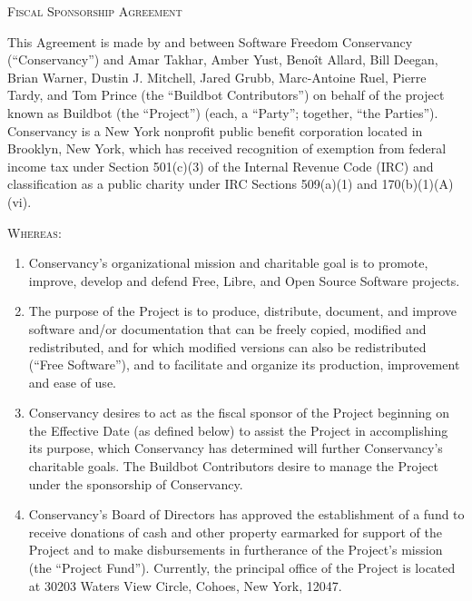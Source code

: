\documentclass[letterpaper,12pt]{article}
\begin{document}
\begin{center}
\textsc{\Huge Fiscal Sponsorship Agreement}{\Huge {} } 
\par\end{center}

\bigskip{}


This Agreement is made by and between Software Freedom Conservancy
(``Conservancy'') and 
Amar Takhar,
Amber Yust,
Benoît Allard,
Bill Deegan,
Brian Warner,
Dustin J. Mitchell,
Jared Grubb,
Marc-Antoine Ruel,
Pierre Tardy, and
Tom Prince
 (the ``Buildbot Contributors'')
on behalf of the project known as Buildbot (the ``Project'') (each, a
``Party''; together, ``the Parties'').  Conservancy is a New York nonprofit
public benefit corporation located in Brooklyn, New York, which has received 
recognition of exemption from federal income tax under Section 501(c)(3) of
the Internal Revenue Code (IRC) and classification as a public charity under 
IRC Sections 509(a)(1) and 170(b)(1)(A)(vi).

\textsc{Whereas:}

\begin{enumerate}[label=\Alph*.,ref=\S \Alph*]
\item Conservancy's organizational mission and charitable goal is to promote,
improve, develop and defend Free, Libre, and Open Source Software
projects. 
\item The purpose of the Project is to produce, distribute, document, and
improve software and/or documentation that can be freely copied, modified and redistributed,
and for which modified versions can also be redistributed (``Free Software''),
and to facilitate and organize its production, improvement and ease
of use. 
\item Conservancy desires to act as the fiscal sponsor of the Project beginning
on the Effective Date (as defined below) to assist the Project in
accomplishing its purpose, which Conservancy has determined will further
Conservancy's charitable goals. The Buildbot Contributors desire to manage
the Project under the sponsorship of Conservancy. 
\item Conservancy's Board of Directors has approved the establishment
of a fund to receive donations of cash and other property earmarked
for support of the Project and to make disbursements in furtherance
of the Project's mission (the ``Project Fund''). Currently, the
principal office of the Project is located at 30203 Waters View Circle, Cohoes, New York, 12047.

\end{enumerate}
\medskip{}
\end{document}
